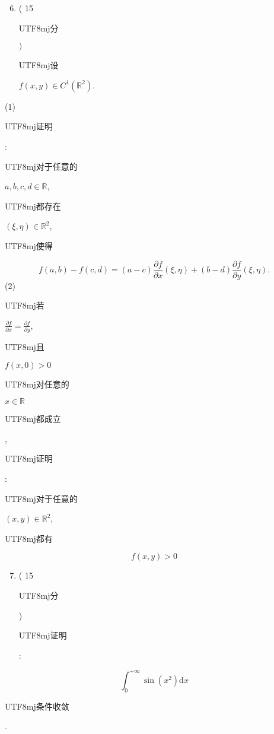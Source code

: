 \documentclass[10pt]{article}
\begin{document}
\begin{enumerate}
  \setcounter{enumi}{5}
  \item ( 15 \begin{CJK}{UTF8}{mj}分\end{CJK} $)$ \begin{CJK}{UTF8}{mj}设\end{CJK} $f(x, y) \in C^{1}\left(\mathbb{R}^{2}\right)$.
\end{enumerate}
(1) \begin{CJK}{UTF8}{mj}证明\end{CJK}: \begin{CJK}{UTF8}{mj}对于任意的\end{CJK} $a, b, c, d \in \mathbb{R}$, \begin{CJK}{UTF8}{mj}都存在\end{CJK} $(\xi, \eta) \in \mathbb{R}^{2}$, \begin{CJK}{UTF8}{mj}使得\end{CJK}
$$
f(a, b)-f(c, d)=(a-c) \frac{\partial f}{\partial x}(\xi, \eta)+(b-d) \frac{\partial f}{\partial y}(\xi, \eta) .
$$
(2) \begin{CJK}{UTF8}{mj}若\end{CJK} $\frac{\partial f}{\partial x}=\frac{\partial f}{\partial y}$, \begin{CJK}{UTF8}{mj}且\end{CJK} $f(x, 0)>0$ \begin{CJK}{UTF8}{mj}对任意的\end{CJK} $x \in \mathbb{R}$ \begin{CJK}{UTF8}{mj}都成立\end{CJK}, \begin{CJK}{UTF8}{mj}证明\end{CJK}: \begin{CJK}{UTF8}{mj}对于任意的\end{CJK} $(x, y) \in \mathbb{R}^{2}$, \begin{CJK}{UTF8}{mj}都有\end{CJK}
$$
f(x, y)>0
$$

\begin{enumerate}
  \setcounter{enumi}{6}
  \item ( 15 \begin{CJK}{UTF8}{mj}分\end{CJK}) \begin{CJK}{UTF8}{mj}证明\end{CJK}:
\end{enumerate}
$$
\int_{0}^{+\infty} \sin \left(x^{2}\right) \mathrm{d} x
$$
\begin{CJK}{UTF8}{mj}条件收敛\end{CJK}.
\end{document}
